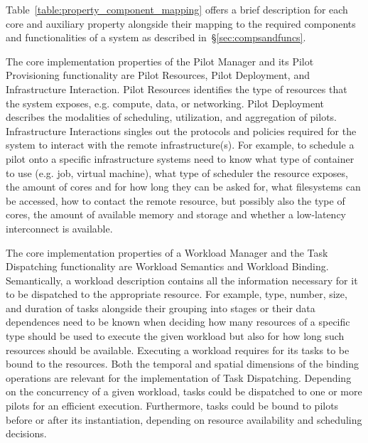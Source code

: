 \documentclass{sig-alternate}
\begin{document}
Table~\ref{table:property_component_mapping} offers a brief description for each
core and auxiliary property alongside their mapping to the required components
and functionalities of a \pilot system as described
in~\S\ref{sec:compsandfuncs}.

The core implementation properties of the Pilot Manager and its Pilot
Provisioning functionality are Pilot Resources, Pilot Deployment, and
Infrastructure Interaction. Pilot Resources identifies the type of resources
that the \pilot system exposes, e.g. compute, data, or networking. Pilot
Deployment describes the modalities of scheduling, utilization, and aggregation
of pilots. Infrastructure Interactions singles out the protocols and policies
required for the \pilot system to interact with the remote infrastructure(s).
For example, to schedule a pilot onto a specific infrastructure \pilot systems
need to know what type of container to use (e.g. job, virtual machine), what
type of scheduler the resource exposes, the amount of cores and for how long
they can be asked for, what filesystems can be accessed, how to contact the
remote resource, but possibly also the type of cores, the amount of available
memory and storage and whether a low-latency interconnect is available.


The core implementation properties of a Workload Manager and the Task
Dispatching functionality are Workload Semantics and Workload Binding.
Semantically, a workload description contains all the information necessary for
it to be dispatched to the appropriate resource. For example, type, number,
size, and duration of tasks alongside their grouping into stages or their data
dependences need to be known when deciding how many resources of a specific type
should be used to execute the given workload but also for how long such
resources should be available. Executing a workload requires for its tasks to be
bound to the resources. Both the temporal and spatial dimensions of the binding
operations are relevant for the implementation of Task Dispatching. Depending on
the concurrency of a given workload, tasks could be dispatched to one or more
pilots for an efficient execution. Furthermore, tasks could be bound to pilots
before or after its instantiation, depending on resource availability and
scheduling decisions.
\end{document}
